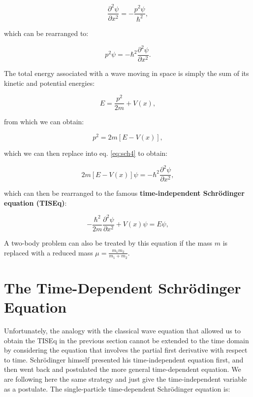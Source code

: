 \documentclass[
  9pt,
]{extbook}
\theoremstyle{definition}
\theoremstyle{definition}
\theoremstyle{definition}
\theoremstyle{remark}
\begin{document}
\begin{equation}
\frac{\partial^2 \psi}{\partial x^2} = -\frac{p^2\psi}{\hbar^2},
\label{eq:sch3}
\end{equation}

which can be rearranged to:

\begin{equation}
p^2 \psi = -\hbar^2 \frac{\partial^2 \psi}{\partial x^2}.
\label{eq:sch4}
\end{equation}

The total energy associated with a wave moving in space is simply the sum of its kinetic and potential energies:

\begin{equation}
E = \frac {p^{2}}{2m} + V(x),
\label{eq:sch5}
\end{equation}

from which we can obtain:

\begin{equation}
p^2 = 2m[E - V(x)],
\label{eq:sch6}
\end{equation}

which we can then replace into eq. \eqref{eq:sch4} to obtain:

\begin{equation}
2m[E-V(x)]\psi = - \hbar^2 \frac{\partial^2 \psi}{\partial x^2},
\label{eq:sch7}
\end{equation}

which can then be rearranged to the famous \textbf{time-independent Schrödinger equation (TISEq)}:

\begin{equation}
- \frac{\hbar^2}{2m} \frac{\partial^2 \psi}{\partial x^2} + V(x) \psi = E\psi,
\label{eq:TISEq}
\end{equation}

A two-body problem can also be treated by this equation if the mass \(m\) is replaced with a reduced mass \(\mu = \frac{m_1 m_2}{m_1+m_2}\).

\hypertarget{the-time-dependent-schruxf6dinger-equation}{%
\section{The Time-Dependent Schrödinger Equation}\label{the-time-dependent-schruxf6dinger-equation}}

Unfortunately, the analogy with the classical wave equation that allowed us to obtain the TISEq in the previous section cannot be extended to the time domain by considering the equation that involves the partial first derivative with respect to time. Schrödinger himself presented his time-independent equation first, and then went back and postulated the more general time-dependent equation. We are following here the same strategy and just give the time-independent variable as a postulate. The single-particle time-dependent Schrödinger equation is:
\end{document}
